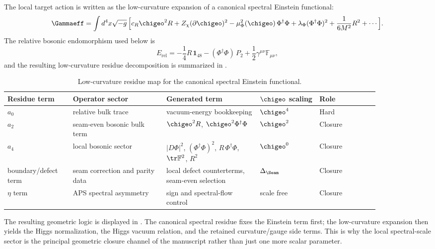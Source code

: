 The local target action is written as the low-curvature expansion of a canonical spectral
Einstein functional:
\begin{equation}
\label{eq:chi-effective-action}
\begin{aligned}
\Gammaeff
=
\int d^4x\sqrt{-g}\,
\Big[
c_R\chigeo^2R
+Z_\chi(\partial\chigeo)^2
-\mu_\Phi^2(\chigeo)\,\Phi^\dagger\Phi
+\lambda_\Phi(\Phi^\dagger\Phi)^2
+\frac{1}{6M^2}R^2
+\cdots
\Big].
\end{aligned}
\end{equation}
The relative bosonic endomorphism used below is
\begin{equation}
\label{eq:relative-bosonic-endomorphism}
E_{\mathrm{rel}}
=
-\frac14 R\,\mathbf 1_{48}
-
(\Phi^\dagger\Phi)\,P_2
+
\frac12\gamma^{\mu\nu}\mathbb F_{\mu\nu},
\end{equation}
and the resulting low-curvature residue decomposition is summarized in
.

\begin{table}[t]
\centering
\scriptsize
\setlength{\tabcolsep}{3pt}
\begin{tabular}{@{}>{\raggedright\arraybackslash}p{0.15\linewidth}>{\raggedright\arraybackslash}p{0.22\linewidth}>{\raggedright\arraybackslash}p{0.22\linewidth}>{\raggedright\arraybackslash}p{0.14\linewidth}>{\raggedright\arraybackslash}p{0.14\linewidth}@{}}
\toprule
Residue term & Operator sector & Generated term & $\chigeo$ scaling & Role \\
\midrule
$a_0$ & relative bulk trace & vacuum-energy bookkeeping & $\chigeo^4$ & Hard \\
$a_2$ & seam-even bosonic bulk term & $\chigeo^2R$, $\chigeo^2\Phi^\dagger\Phi$ & $\chigeo^2$ & Closure \\
$a_4$ & local bosonic sector & $|D\Phi|^2$, $(\Phi^\dagger\Phi)^2$, $R\,\Phi^\dagger\Phi$, $\tr\mathbb F^2$, $R^2$ & $\chigeo^0$ & Closure \\
boundary/defect term & seam correction and parity data & local defect counterterms, seam-even selection & $\Delta_{\Seam}$ & Closure \\
$\eta$ term & APS spectral asymmetry & sign and spectral-flow control & scale free & Closure \\
\bottomrule
\end{tabular}
\caption{Low-curvature residue map for the canonical spectral Einstein functional.}
\label{tab:heat-kernel-map}
\end{table}

The resulting geometric logic is displayed in . The canonical spectral
residue fixes the Einstein term first; the low-curvature expansion then yields the Higgs
normalization, the Higgs vacuum relation, and the retained curvature/gauge side terms. This is
why the local spectral-scale sector is the principal geometric closure channel of the manuscript
rather than just one more scalar parameter.

